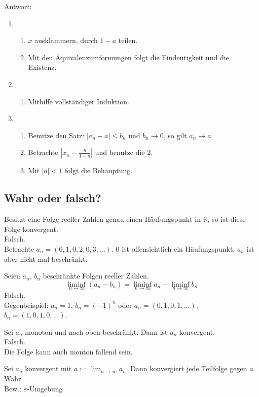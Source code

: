 Antwort:
\begin{enumerate}
    \item
    \begin{enumerate}
        \item $x$ ausklammern, durch $1-a$ teilen.
        \item Mit den Äquivalenzumformungen folgt die Eindeutigkeit und die Existenz.
    \end{enumerate}
    \item
    \begin{enumerate}
        \item Mithilfe vollständiger Induktion.
    \end{enumerate}
    \item
    \begin{enumerate}
        \item Benutze den Satz: $|a_n - a| \leq b_n$ und $b_n \to 0$, so gilt $a_n \to a$.
        \item Betrachte $|x_n - \frac{b}{1-a}|$ und benutze die 2.
        \item Mit $|a| < 1$ folgt die Behauptung.
    \end{enumerate}
\end{enumerate}

\subsection{Wahr oder falsch?}
Besitzt eine Folge reeller Zahlen genau einen Häufungspunkt in $\mathbb{R}$, so ist diese Folge konvergent.\\
Falsch.\\
Betrachte $a_n = (0,1,0,2,0,3,\dots)$. $0$ ist offensichtlich ein Häufungspunkt, $a_n$ ist aber nicht mal beschränkt.

Seien $a_n$, $b_n$ beschränkte Folgen reeller Zahlen.
\begin{displaymath}
  \liminf_{n \to \infty} (a_n - b_n) = \liminf_{n \to \infty} a_n - \liminf_{n \to \infty} b_n
\end{displaymath}
Falsch.\\
Gegenbeispiel: $a_n = 1$, $b_n = (-1)^n$ oder $a_n = (0,1,0,1,\dots)$, $b_n = (1,0,1,0,\dots)$.

Sei $a_n$ monoton und nach oben beschränkt.
Dann ist $a_n$ konvergent.\\
Falsch.\\
Die Folge kann auch monton fallend sein.

Sei $a_n$ konvergent mit $a := \lim_{n \to \infty} a_n$.
Dann konvergiert jede Teilfolge gegen $a$.\\
Wahr.\\
Bew.: $\varepsilon$-Umgebung

